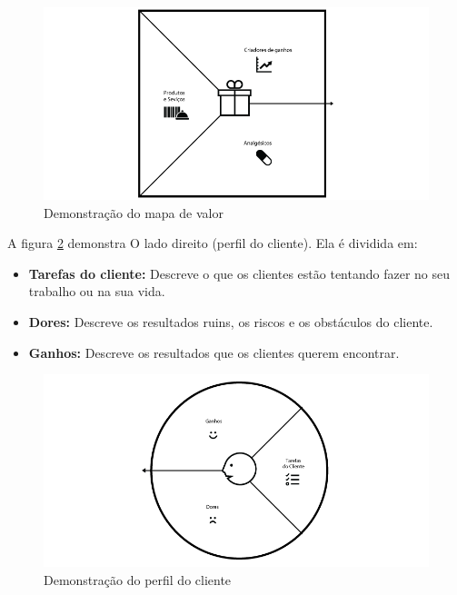\begin{figure}[htbp!] \begin{center}
\includegraphics[width=1\linewidth]{./figuras/Mapa-de-Valor-Canvas-de-Proposta-de-Valor}
\caption{Demonstração do mapa de valor}
\label{Fig:mapa-valor-canvas}
\end{center} 
\end{figure}

A figura \ref{Fig:perfil-cliente-canvas} demonstra O lado direito (perfil do cliente). Ela é dividida em: 
\begin{itemize}
    \item \textbf{Tarefas do cliente:} Descreve o que os clientes estão tentando fazer no seu trabalho ou na sua vida.
    \item \textbf{Dores:} Descreve os resultados ruins, os riscos e os obstáculos do cliente.
    \item \textbf{Ganhos:} Descreve os resultados que os clientes querem encontrar.
\end{itemize}

\begin{figure}[htbp!] \begin{center}
\includegraphics[width=1\linewidth]{./figuras/Perfil-do-Clientes-Canvas-de-Proposta-de-Valor}
\caption{Demonstração do perfil do cliente}
\label{Fig:perfil-cliente-canvas}
\end{center} 
\end{figure}


